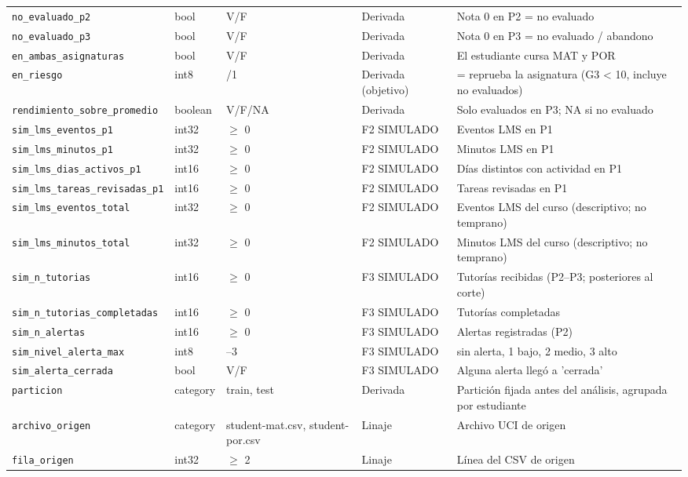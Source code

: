 {\begin{longtable}{>{\raggedright\arraybackslash}p{3.9cm}p{1.2cm}>{\raggedright\arraybackslash}p{2.0cm}>{\raggedright\arraybackslash}p{2.3cm}>{\raggedright\arraybackslash}p{4.8cm}}
\texttt{no\_evaluado\_p2} & bool & V/F & Derivada & Nota 0 en P2 = no evaluado \\
\texttt{no\_evaluado\_p3} & bool & V/F & Derivada & Nota 0 en P3 = no evaluado / abandono \\
\texttt{en\_ambas\_asignaturas} & bool & V/F & Derivada & El estudiante cursa MAT y POR \\
\texttt{en\_riesgo} & int8 & 0/1 & Derivada (objetivo) & 1 = reprueba la asignatura (G3 < 10, incluye no evaluados) \\
\texttt{rendimiento\_sobre\_promedio} & boolean & V/F/NA & Derivada & Solo evaluados en P3; NA si no evaluado \\
\texttt{sim\_lms\_eventos\_p1} & int32 & $\geq$ 0 & F2 SIMULADO & Eventos LMS en P1 \\
\texttt{sim\_lms\_minutos\_p1} & int32 & $\geq$ 0 & F2 SIMULADO & Minutos LMS en P1 \\
\texttt{sim\_lms\_dias\_activos\_p1} & int16 & $\geq$ 0 & F2 SIMULADO & Días distintos con actividad en P1 \\
\texttt{sim\_lms\_tareas\_revisadas\_p1} & int16 & $\geq$ 0 & F2 SIMULADO & Tareas revisadas en P1 \\
\texttt{sim\_lms\_eventos\_total} & int32 & $\geq$ 0 & F2 SIMULADO & Eventos LMS del curso (descriptivo; no temprano) \\
\texttt{sim\_lms\_minutos\_total} & int32 & $\geq$ 0 & F2 SIMULADO & Minutos LMS del curso (descriptivo; no temprano) \\
\texttt{sim\_n\_tutorias} & int16 & $\geq$ 0 & F3 SIMULADO & Tutorías recibidas (P2–P3; posteriores al corte) \\
\texttt{sim\_n\_tutorias\_completadas} & int16 & $\geq$ 0 & F3 SIMULADO & Tutorías completadas \\
\texttt{sim\_n\_alertas} & int16 & $\geq$ 0 & F3 SIMULADO & Alertas registradas (P2) \\
\texttt{sim\_nivel\_alerta\_max} & int8 & 0–3 & F3 SIMULADO & 0 sin alerta, 1 bajo, 2 medio, 3 alto \\
\texttt{sim\_alerta\_cerrada} & bool & V/F & F3 SIMULADO & Alguna alerta llegó a 'cerrada' \\
\texttt{particion} & category & train, test & Derivada & Partición fijada antes del análisis, agrupada por estudiante \\
\texttt{archivo\_origen} & category & student-mat.csv, student-por.csv & Linaje & Archivo UCI de origen \\
\texttt{fila\_origen} & int32 & $\geq$ 2 & Linaje & Línea del CSV de origen \\
\bottomrule
\end{longtable}}
